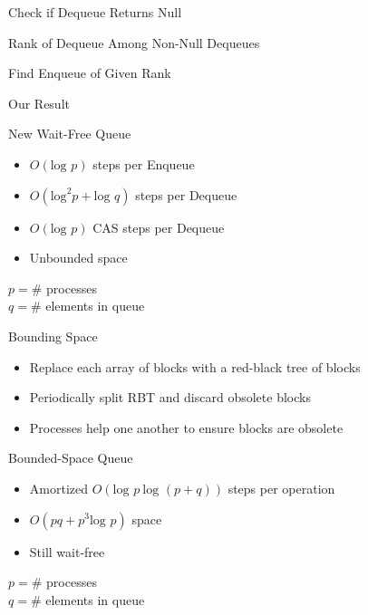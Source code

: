 \documentclass[compress]{beamer}
\newcommand{\op}[1]{\mbox{\sc #1}}
\renewcommand{\log}{\mbox{log }} %
\begin{document}
\begin{frame}{Check if \op{Dequeue} Returns Null}

\vfill


\end{frame}


\begin{frame}{Rank of \op{Dequeue} Among Non-Null \op{Dequeues}}
%

\vfill


\end{frame}

\begin{frame}{Find \op{Enqueue} of Given Rank}


\vfill


\end{frame}

\begin{frame}{Our Result}

\begin{block}{New Wait-Free Queue}
\begin{itemize}
\item $O(\log p)$ steps per \op{Enqueue}
\item $O(\mbox{log}^2 p + \log q)$ steps per \op{Dequeue}
\item $O(\log p)$ CAS steps per \op{Dequeue}
\item<2> Unbounded space
\end{itemize}
\end{block}

$p = \#$ processes\\
$q = \#$ elements in queue
\end{frame}

\begin{frame}{Bounding Space}

\begin{itemize}
\item Replace each array of blocks with a red-black tree of blocks
\item Periodically split RBT and discard obsolete blocks
\item Processes  help one another to ensure blocks are obsolete
\end{itemize}

\begin{block}{Bounded-Space Queue}
\begin{itemize}
\item Amortized $O(\log p\ \log(p+q))$ steps per operation
\item $O(pq+p^3\log p)$ space
\item Still wait-free
\end{itemize}
\end{block}

$p = \#$ processes\\
$q = \#$ elements in queue

\end{frame}
\end{document}
